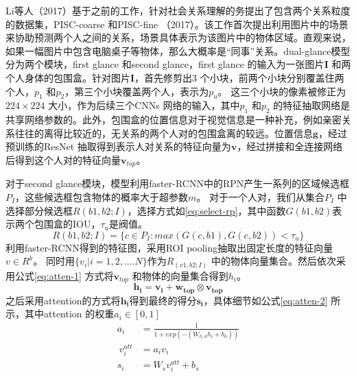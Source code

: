 Li等人（2017）\cite{li2017dual-glance}基于之前的工作，针对社会关系理解的务提出了包含两个关系粒度的数据集，PISC-coarse 和PISC-fine （2017）\cite{li2017dual-glance}。该工作首次提出利用图片中的场景来协助预测两个人之间的关系，场景具体表示为该图片中的物体区域。直观来说，如果一幅图片中包含电脑桌子等物体，那么大概率是``同事''关系。dual-glance模型分为两个模块，first glance 和second glance，first glance 的输入为一张图片$\mathbf{I}$ 和两个人身体的包围盒。针对图片$\mathbf{I}$，首先修剪出3 个小块，前两个小块分别覆盖住两个人，$p_1$ 和$p_2$，第三个小块覆盖两个人，表示为$p_{u}$。 这三个小块的像素被修正为$224 \times 224$ 大小，作为后续三个CNNs 网络的输入，其中$p_1$ 和$p_2$ 的特征抽取网络是共享网络参数的。此外，包围盒的位置信息对于视觉信息是一种补充，例如亲密关系往往的离得比较近的，无关系的两个人对的包围盒离的较远。位置信息$\mathbf{g}$，经过预训练的ResNet\cite{he2016deep} 抽取得到表示人对关系的特征向量为$\mathbf{v}$，经过拼接和全连接网络后得到这个人对的特征向量$\mathbf{v}_{top}$。

对于second glance模块，模型利用faster-RCNN\cite{ren2015faster}中的RPN产生一系列的区域候选框$P_{I}$，这些候选框包含物体的概率大于超参数$m$。 对于一个人对，我们从集合$P_{I}$ 中选择部分候选框$R(b1,b2;I)$，选择方式如\ref{eq:select-rp}，其中函数$G(b1,b2)$表示两个包围盒的IOU，$\tau_{u}$是阀值。
\begin{equation}\label{eq:select-rp}
    R(b1,b2;I) = \{c \in P_{I} : max(G(c,b1),G(c,b2))<\tau_{u}\}
\end{equation}
利用faster-RCNN得到的特征图，采用ROI pooling抽取出固定长度的特征向量$v \in R^{k}$。 同时用$\{v_i|i=1, 2, .... N\}$作为$R_(v1,b2;I)$ 中的物体向量集合。然后依次采用公式\ref{eq:atten-1} 方式将$\mathbf{v}_{top}$ 和物体的向量集合得到$h_i$。
\begin{equation}\label{eq:atten-1}
    \mathbf{h_i} = \mathbf{v_i} + \mathbf{w_{top}} \otimes \mathbf{v_{top}}
\end{equation}
之后采用attention的方式将$\mathbf{h_i}$得到最终的得分$\mathbf{s_i}$，具体细节如公式\ref{eq:atten-2} 所示，其中attention 的权重$a_{i} \in [0,1]$
\begin{equation} \label{eq:atten-2}
    \begin{split}
        a_{i} &= \frac{1}{1+exp(-(W_{h,a}h_{i}+b_{a}))} \\
        ~v^{att}_{i} &= a_{i}v_{i} \\
        s_{i} &= W_{s} v_{i}^{att} + b_{s}
    \end{split}
\end{equation}


